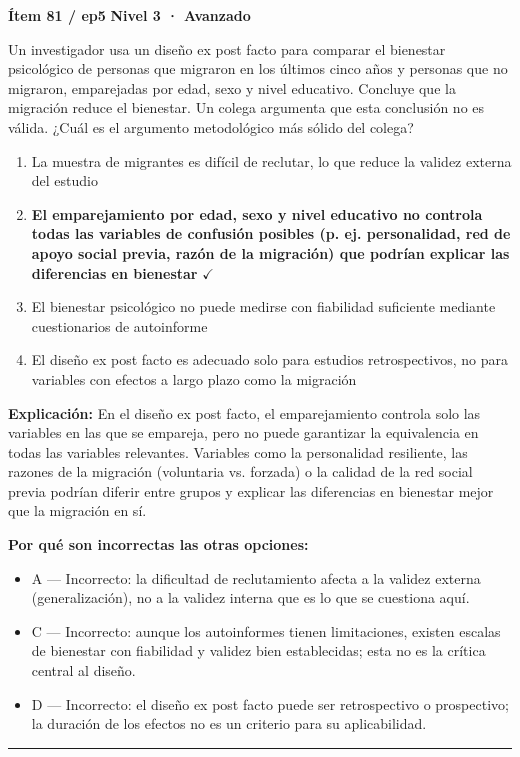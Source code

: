 \documentclass[12pt,a4paper]{article}
\begin{document}
\begin{mdframed}[backgroundcolor=fondogris,linecolor=rojo,linewidth=1pt,innerleftmargin=10pt,innerrightmargin=10pt,innertopmargin=7pt,innerbottommargin=7pt]
\textbf{Ítem 81 / ep5} \hfill {\small\bfseries\color{rojo} Nivel 3 · Avanzado}
\end{mdframed}

Un investigador usa un diseño ex post facto para comparar el bienestar psicológico de personas que migraron en los últimos cinco años y personas que no migraron, emparejadas por edad, sexo y nivel educativo. Concluye que la migración reduce el bienestar. Un colega argumenta que esta conclusión no es válida. ¿Cuál es el argumento metodológico más sólido del colega?

\begin{enumerate}
  \item[A.] La muestra de migrantes es difícil de reclutar, lo que reduce la validez externa del estudio
  \item[\textbf{\color{verde}B.}] \textbf{\color{verde} El emparejamiento por edad, sexo y nivel educativo no controla todas las variables de confusión posibles (p. ej. personalidad, red de apoyo social previa, razón de la migración) que podrían explicar las diferencias en bienestar} \hfill $\checkmark$
  \item[C.] El bienestar psicológico no puede medirse con fiabilidad suficiente mediante cuestionarios de autoinforme
  \item[D.] El diseño ex post facto es adecuado solo para estudios retrospectivos, no para variables con efectos a largo plazo como la migración
\end{enumerate}

\noindent\textbf{\color{azul}Explicación:} En el diseño ex post facto, el emparejamiento controla solo las variables en las que se empareja, pero no puede garantizar la equivalencia en todas las variables relevantes. Variables como la personalidad resiliente, las razones de la migración (voluntaria vs. forzada) o la calidad de la red social previa podrían diferir entre grupos y explicar las diferencias en bienestar mejor que la migración en sí.

\noindent\textbf{\color{gris}Por qué son incorrectas las otras opciones:}
\begin{itemize}
  \item {\small A — Incorrecto: la dificultad de reclutamiento afecta a la validez externa (generalización), no a la validez interna que es lo que se cuestiona aquí.}
  \item {\small C — Incorrecto: aunque los autoinformes tienen limitaciones, existen escalas de bienestar con fiabilidad y validez bien establecidas; esta no es la crítica central al diseño.}
  \item {\small D — Incorrecto: el diseño ex post facto puede ser retrospectivo o prospectivo; la duración de los efectos no es un criterio para su aplicabilidad.}
\end{itemize}
\vspace{8pt}\hrule\vspace{10pt}
\end{document}
